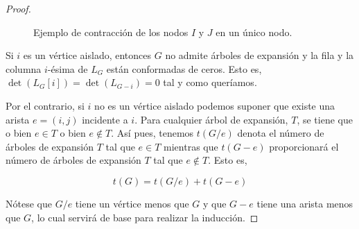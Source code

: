 \begin{proof}
\begin{figure}[H]
\centering
{}
\caption{Ejemplo de contracción de los nodos $I$ y $J$ en un único nodo.}
\label{fig:contraction}
\end{figure}

Si $i$ es un vértice aislado, entonces $G$ no admite árboles de expansión y la fila y la columna $i$-ésima de $L_G$ están conformadas de ceros. Esto es, $\det(L_G[i]) = \det(L_{G-i}) = 0$ tal y como queríamos.

Por el contrario, si $i$ no es un vértice aislado podemos suponer que existe una arista $e = (i,j)$ incidente a $i$. Para cualquier árbol de expansión, $T$, se tiene que o bien $e \in T$ o bien $e \notin T$. Así pues, tenemos $t(G/e)$ denota el número de árboles de expansión $T$ tal que $e \in T$ mientras que $t(G-e)$ proporcionará el número de árboles de expansión $T$ tal que $e \notin T$. Esto es,

\begin{equation}
t(G) = t(G/e) + t(G-e)
\end{equation}

Nótese que $G/e$ tiene un vértice menos que $G$ y que $G-e$ tiene una arista menos que $G$, lo cual servirá de base para realizar la inducción.


\end{proof}
